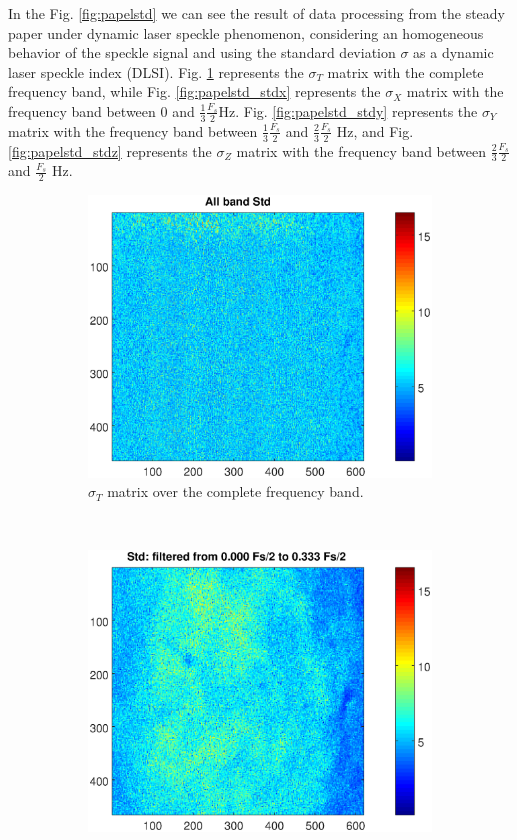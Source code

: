 \documentclass[review]{elsarticle}
\begin{document}
In the Fig. \ref{fig:papelstd} we can see the result of data processing from the steady
 paper under dynamic laser speckle phenomenon, 
considering an homogeneous behavior of the speckle signal and using the standard deviation $\sigma$ 
as a dynamic laser speckle index (DLSI). 
Fig. \ref{fig:papelall} represents the $\sigma_T$ matrix with the complete frequency band, while Fig. \ref{fig:papelstd_stdx}
represents the $\sigma_X$ matrix with the frequency band between $0$ and $\frac{1}{3}\frac{F_s}{2}$Hz.
Fig. \ref{fig:papelstd_stdy} represents the $\sigma_Y$ matrix with the frequency band between 
$\frac{1}{3}\frac{F_s}{2}$ and $\frac{2}{3}\frac{F_s}{2}$ Hz, and Fig. \ref{fig:papelstd_stdz} 
represents the $\sigma_Z$ matrix with the frequency band between $\frac{2}{3}\frac{F_s}{2}$ and $\frac{F_s}{2}$ Hz.
\begin{figure}[h!]
    \centering
    \begin{subfigure}[b]{0.485\textwidth}
        \includegraphics[width=\textwidth]{stdall.eps}
	\caption{$\sigma_T$ matrix over the complete frequency band.}
        \label{fig:papelall}
    \end{subfigure}
    ~
    \begin{subfigure}[b]{0.465\textwidth}
        \includegraphics[width=\textwidth]{stdx.eps}

\end{subfigure}
\end{figure}
\end{document}

